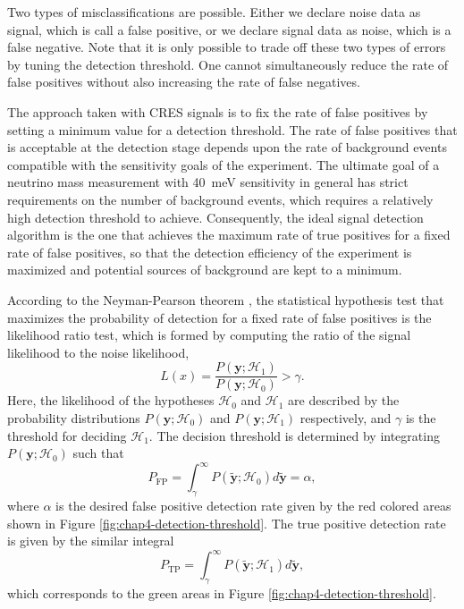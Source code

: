 Two types of misclassifications are possible. Either we declare noise data as signal, which is call a false positive, or we declare signal data as noise, which is a false negative. Note that it is only possible to trade off these two types of errors by tuning the detection threshold. One cannot simultaneously reduce the rate of false positives without also increasing the rate of false negatives.

The approach taken with CRES signals is to fix the rate of false positives by setting a minimum value for a detection threshold. The rate of false positives that is acceptable at the detection stage depends upon the rate of background events compatible with the sensitivity goals of the experiment. The ultimate goal of a neutrino mass measurement with 40~meV sensitivity in general has strict requirements on the number of background events, which requires a relatively high detection threshold to achieve. Consequently, the ideal signal detection algorithm is the one that achieves the maximum rate of true positives for a fixed rate of false positives, so that the detection efficiency of the experiment is maximized and potential sources of background are kept to a minimum.

According to the Neyman-Pearson theorem \cite{neyman_pearson_lemma}, the statistical hypothesis test that maximizes the probability of detection for a fixed rate of false positives is the likelihood ratio test, which is formed by computing the ratio of the signal likelihood to the noise likelihood,
\begin{equation}
    L(x)=\frac{P(\bm{y};\mathcal{H}_1)}{P(\bm{y};\mathcal{H}_0)}>\gamma.
\end{equation}
Here, the likelihood of the hypotheses $\mathcal{H}_0$ and $\mathcal{H}_1$ are described by the probability distributions $P(\bm{y};\mathcal{H}_0)$ and $P(\bm{y};\mathcal{H}_1)$ respectively, and $\gamma$ is the threshold for deciding $\mathcal{H}_1$. The decision threshold is determined by integrating $P(\bm{y};\mathcal{H}_0)$ such that 
\begin{equation}
    P_{\textrm{FP}}=\int_\gamma^\infty{P(\tilde{\bm{y}};\mathcal{H}_0)d\tilde{\bm{y}}}=\alpha,
\end{equation}
where $\alpha$ is the desired false positive detection rate given by the red colored areas shown in Figure \ref{fig:chap4-detection-threshold}. The true positive detection rate is given by the similar integral 
\begin{equation}
    P_{\textrm{TP}}=\int_\gamma^\infty{P(\tilde{\bm{y}};\mathcal{H}_1)d\tilde{\bm{y}}},
\end{equation}
which corresponds to the green areas in Figure \ref{fig:chap4-detection-threshold}.

